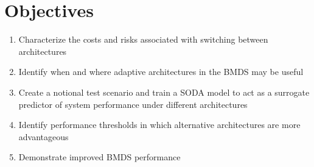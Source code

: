 \section{Objectives}

\begin{enumerate}
	\item Characterize the costs and risks associated with switching between architectures
	\item Identify when and where adaptive architectures in the BMDS may be useful
	\item Create a notional test scenario and train a SODA model to act as a surrogate predictor of system performance under different architectures
	\item Identify performance thresholds in which alternative architectures are more advantageous
	\item Demonstrate improved BMDS performance 
\end{enumerate}